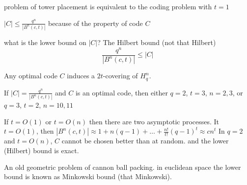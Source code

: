 \documentclass[a4paper]{article}
\newcommand{\brac}[1]{{\left ( #1 \right )}}
\newcommand{\abs}[1]{{\left | #1 \right |}}
\begin{document}
problem of tower placement is equivalent to the coding problem with $t=1$

$\abs{C}\leq \frac{q^n}{\abs{B^n(c,t)}}$ because of the property of code $C$

what is the lower bound on $\abs{C}$? The Hilbert bound (not that Hilbert)
\[\frac{q^n}{\abs{B^n(c,t)}} \leq \abs{C}\]


Any optimal code $C$ induces a $2t$-covering of $H_q^n$.

If $\abs{C} = \frac{q^n}{\abs{B^n(c,t)}}$ and $C$ is an optimal code, then either $q=2$, $t=3$, $n=2,3$, or $q=3$, $t=2$, $n=10,11$

If $t=O(1)$ or $t=O(n)$ then there are two asymptotic processes.
It $t=O(1)$, then $\abs{B^n(c,t)} \approx 1+n (q-1)+\ldots + \frac{n!}{t!}\brac{q-1}^t\approx c n^t$
In $q=2$ and $t=O(n)$, $C$ cannot be chosen better than at random. and the lower (Hilbert) bound is exact.

An old geometric problem of cannon ball packing. in euclidean space the lower bound is known as Minkowski bound (that Minkowski).
\end{document}
